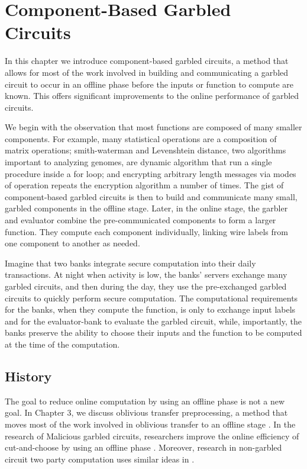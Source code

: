
\chapter{Component-Based Garbled Circuits}

In this chapter we introduce component-based garbled circuits, a method that allows for most of the work involved in building and communicating a garbled circuit to occur in an offline phase before the inputs or function to compute are known. 
This offers significant improvements to the online performance of garbled circuits. 

We begin with the observation that most functions are composed of many smaller components. 
For example, many statistical operations are a composition of matrix operations; smith-waterman and Levenshtein distance, two algorithms important to analyzing genomes, are dynamic algorithm that run a single procedure inside a for loop; and encrypting arbitrary length messages via modes of operation repeats the encryption algorithm a number of times.
The gist of component-based garbled circuits is then to build and communicate many small, garbled components in the offline stage.
Later, in the online stage, the garbler and evaluator combine the pre-communicated components to form a larger function. 
They compute each component individually, linking wire labels from one component to another as needed. 

Imagine that two banks integrate secure computation into their daily transactions.
At night when activity is low, the banks' servers exchange many garbled circuits, and then during the day, they use the pre-exchanged garbled circuits to quickly perform secure computation.
The computational requirements for the banks, when they compute the function, is only to exchange input labels and for the evaluator-bank to evaluate the garbled circuit, while, importantly, the banks preserve the ability to choose their inputs and the function to be computed at the time of the computation. 

\section{History}
The goal to reduce online computation by using an offline phase is not a new goal.
In Chapter 3, we discuss oblivious transfer preprocessing, a method that moves most of the work involved in oblivious transfer to an offline stage \cite{Bea95}. 
In the research of Malicious garbled circuits, researchers improve the online efficiency of cut-and-choose by using an offline phase \cite{HKK14, LR14, LR15}.
Moreover, research in non-garbled circuit two party computation uses similar ideas in \cite{DPSZ12, NNOB12}. 

